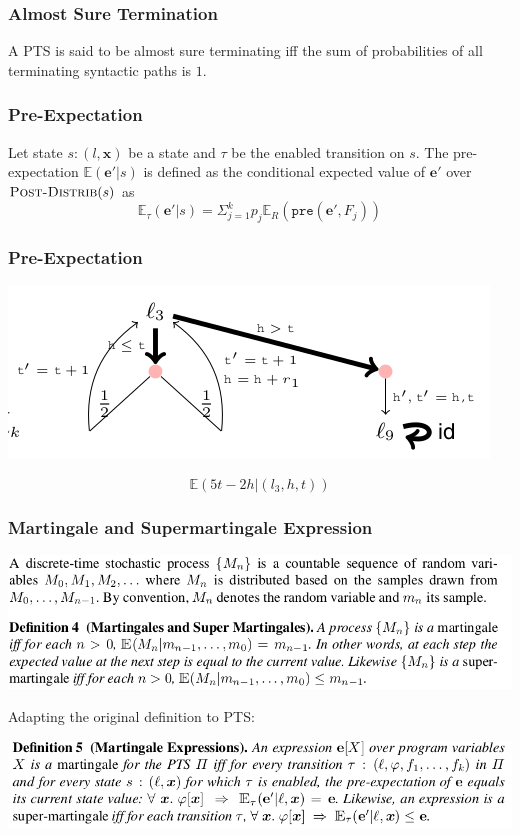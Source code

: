 \documentclass[11pt]{beamer}
\begin{document}
\begin{frame}\frametitle{Almost Sure Termination}
\begin{definition}[a.s. Termination]
A PTS is said to be almost sure terminating iff the sum of probabilities of all  terminating syntactic paths is $1$.
\end{definition}
\end{frame}
\begin{frame}\frametitle{Pre-Expectation}
\begin{definition}
Let state $s:(l,\mathbf{x})$ be a state and $\tau$ be the enabled transition on $s$. The pre-expectation $\mathbb{E}(\mathbf{e}'|s)$ is defined as the conditional expected value of $\mathbf{e}'$ over $\textsc{Post-Distrib}(s)$ as 
\[\mathbb{E}_\tau(\mathbf{e}'|s) = \Sigma_{j = 1}^k p_j\mathbb{E}_R(\mathtt{pre}(\mathbf{e}', F_j))\]
\end{definition}
\end{frame}

\begin{frame}\frametitle{Pre-Expectation}
\begin{center}
\includegraphics[scale=0.4]{def1exp.png}
\end{center}
\begin{example}
\[\mathbb{E}(5t-2h|(l_3, h, t))\]

\end{example}

\end{frame}

\begin{frame}\frametitle{Martingale and Supermartingale Expression}
\begin{center}
\includegraphics[scale=0.35]{def:martingale.png}
\end{center}
Adapting the original definition to PTS:
\begin{center}
\includegraphics[scale=0.35]{def:martingaleexp.png}
\end{center}
\end{frame}
\end{document}
